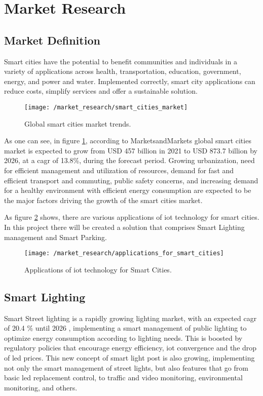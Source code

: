\section{Market Research}

\subsection{Market Definition}
Smart cities have the potential to benefit communities and individuals in a variety of applications across health, transportation, education, government, energy, and power and water. Implemented correctly, smart city applications can reduce costs, simplify services and offer a sustainable solution. \cite{smart_city_application_needs} 

\begin{figure}[ht]
	\centering
	\texttt{[image: /market\_research/smart\_cities\_market]}
	\caption{Global smart cities market trends.}
	\label{fig:smart_city_growth}
\end{figure}

As one can see, in figure \ref{fig:smart_city_growth}, according to MarketsandMarkets \cite{smart_cities_market} global smart cities market is expected to grow from USD 457 billion in 2021 to USD 873.7 billion by 2026, at a \ac{cagr} of 13.8\%, during the forecast period. Growing urbanization, need for efficient management and utilization of resources, demand for fast and efficient transport and commuting, public safety concerns, and increasing demand for a healthy environment with efficient energy consumption are expected to be the major factors driving the growth of the smart cities market.

As figure \ref{fig:smart_cities_sols} shows, there are various applications of \ac{iot} technology for smart cities. In this project there will be created a solution that comprises Smart Lighting management and Smart Parking.

\begin{figure}[ht]
	\centering
	\texttt{[image: /market\_research/applications\_for\_smart\_cities]}
	\caption{Applications of \ac{iot} technology for Smart Cities. \cite{smart_cities_solutions}}
	\label{fig:smart_cities_sols}
\end{figure}

\subsection{Smart Lighting}
Smart Street lighting is a rapidly growing lighting market, with an expected \ac{cagr} of 20.4 \% until 2026 \cite{smart_light_market}, implementing a smart management of public lighting to optimize energy consumption according to lighting needs. This is boosted by regulatory policies that encourage energy efficiency, \ac{iot} convergence and the drop of \ac{led} prices. This new concept of smart light post is also growing, implementing not only the smart management of street lights, but also features that go from basic \ac{led} replacement control, to traffic and video monitoring, environmental monitoring, and others.

